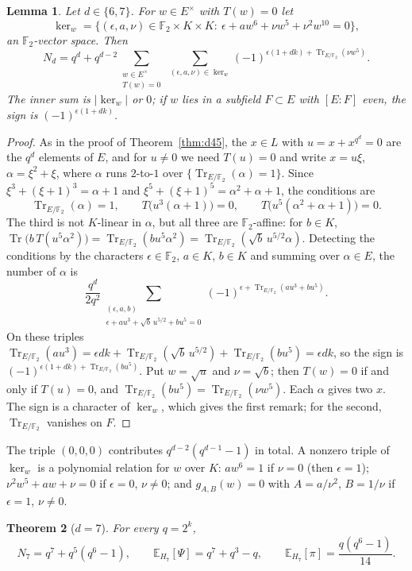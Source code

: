 \documentclass[11pt,a4paper]{amsart}
\newtheorem{theorem}{Theorem}[section]
\newtheorem{lemma}[theorem]{Lemma}
\theoremstyle{definition}
\theoremstyle{remark}
\newcommand{\F}{\mathbb{F}}
\newcommand{\Tr}{\operatorname{Tr}}
\newcommand{\E}{\mathbb{E}}
\begin{document}
\begin{lemma}\label{lem:dual67}
Let $d\in\{6,7\}$. For $w\in E^\times$ with $T(w)=0$ let
\[
\ker\nolimits_w=\bigl\{(\epsilon,a,\nu)\in\F_2\times K\times K:\ \epsilon+aw^6+\nu w^5+\nu^2w^{10}=0\bigr\},
\]
an $\F_2$-vector space. Then
\[
N_d=q^d+q^{d-2}\sum_{\substack{w\in E^\times\\ T(w)=0}}\ \sum_{(\epsilon,a,\nu)\in\ker_w}(-1)^{\epsilon(1+dk)+\Tr_{E/\F_2}(\nu w^5)} .
\]
The inner sum is $|\ker_w|$ or $0$; if $w$ lies in a subfield $F\subset E$ with $[E:F]$ even, the sign is
$(-1)^{\epsilon(1+dk)}$.
\end{lemma}

\begin{proof}
As in the proof of Theorem~\ref{thm:d45}, the $x\in L$ with $u=x+x^{q^d}=0$ are the $q^d$ elements of $E$, and for
$u\ne0$ we need $T(u)=0$ and write $x=u\xi$, $\alpha=\xi^2+\xi$, where $\alpha$ runs $2$-to-$1$ over
$\{\Tr_{E/\F_2}(\alpha)=1\}$. Since $\xi^3+(\xi+1)^3=\alpha+1$ and $\xi^5+(\xi+1)^5=\alpha^2+\alpha+1$, the conditions
are
\[
\Tr_{E/\F_2}(\alpha)=1,\qquad T\bigl(u^3(\alpha+1)\bigr)=0,\qquad T\bigl(u^5(\alpha^2+\alpha+1)\bigr)=0 .
\]
The third is not $K$-linear in $\alpha$, but all three are $\F_2$-affine: for $b\in K$,
$\Tr\bigl(b\,T(u^5\alpha^2)\bigr)=\Tr_{E/\F_2}(bu^5\alpha^2)=\Tr_{E/\F_2}(\sqrt b\,u^{5/2}\alpha)$. Detecting the
conditions by the characters $\epsilon\in\F_2$, $a\in K$, $b\in K$ and summing over $\alpha\in E$, the number of
$\alpha$ is
\[
\frac{q^d}{2q^2}\sum_{\substack{(\epsilon,a,b)\\ \epsilon+au^3+\sqrt b\,u^{5/2}+bu^5=0}}(-1)^{\epsilon+\Tr_{E/\F_2}(au^3+bu^5)} .
\]
On these triples $\Tr_{E/\F_2}(au^3)=\epsilon dk+\Tr_{E/\F_2}(\sqrt b\,u^{5/2})+\Tr_{E/\F_2}(bu^5)=\epsilon dk$, so
the sign is $(-1)^{\epsilon(1+dk)+\Tr_{E/\F_2}(bu^5)}$. Put $w=\sqrt u$ and $\nu=\sqrt b$; then $T(w)=0$ if and only
if $T(u)=0$, and $\Tr_{E/\F_2}(bu^5)=\Tr_{E/\F_2}(\nu w^5)$. Each $\alpha$ gives two $x$. The sign is a character of
$\ker_w$, which gives the first remark; for the second, $\Tr_{E/\F_2}$ vanishes on $F$.
\end{proof}

The triple $(0,0,0)$ contributes $q^{d-2}(q^{d-1}-1)$ in total. A nonzero triple of $\ker_w$ is a polynomial relation
for $w$ over $K$: $aw^6=1$ if $\nu=0$ (then $\epsilon=1$); $\nu^2w^5+aw+\nu=0$ if $\epsilon=0$, $\nu\ne0$; and
$g_{A,B}(w)=0$ with $A=a/\nu^2$, $B=1/\nu$ if $\epsilon=1$, $\nu\ne0$.

\begin{theorem}[$d=7$]\label{thm:d7}
For every $q=2^k$,
\[
N_7=q^7+q^5(q^6-1),\qquad \E_{H_7}[\Psi]=q^7+q^3-q,\qquad \E_{H_7}[\pi]=\frac{q(q^6-1)}{14}.
\]
\end{theorem}
\end{document}
